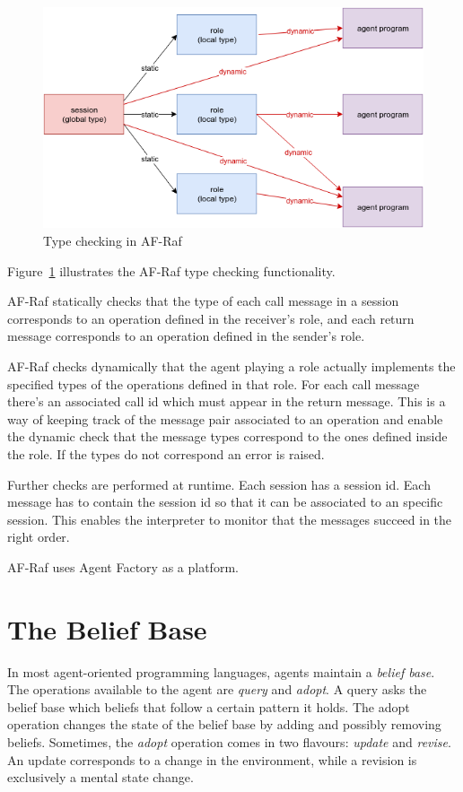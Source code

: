 \documentclass[a4paper,12pt,oneside,fleqn]{book} %
\begin{document}
{\begin{figure}\footnotesize %
\includegraphics{typechecking.png}
\caption{Type checking in AF-Raf}
\label{fig:typechecking}
\end{figure} %

Figure~\ref{fig:typechecking} illustrates the AF-Raf type checking
functionality.

AF-Raf statically checks that the type of each call message in a session
corresponds to an operation defined in the receiver's role, and each return
message corresponds to an operation defined in the sender's role.

AF-Raf checks dynamically that the agent playing a role actually implements
the specified types of the operations defined in that role.  For each call
message there's an associated call id which must appear in the return
message. This is a way of keeping track of the message pair associated to
an operation and enable the dynamic check that the message types correspond
to the ones defined inside the role. If the types do not correspond an
error is raised.

Further checks are performed at runtime. Each session has a session id.
Each message has to contain the session id so that it can be associated to
an specific session. This enables the interpreter to monitor that the
messages succeed in the right order.

AF-Raf uses Agent Factory as a platform. 
\section{The Belief Base} %

In most agent-oriented programming languages, agents maintain a
\emph{belief base}.  The operations available to the agent are
\textit{query} and \textit{adopt}.  A query asks the belief base which
beliefs that follow a certain pattern it holds.  The adopt operation
changes the state of the belief base by adding and possibly removing
beliefs.  Sometimes, the {\it adopt\/} operation comes in two flavours:
{\it update\/} and {\it revise}.  An update corresponds to a change in the
environment, while a revision is exclusively a mental state change.

}
\end{document}
